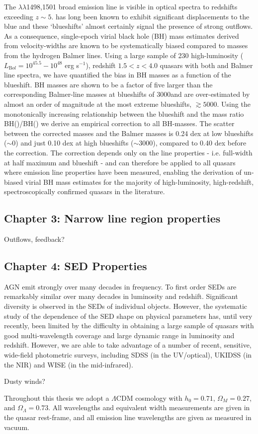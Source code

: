 The $\lambda\lambda$1498,1501 broad emission line is visible in optical spectra to redshifts exceeding $z\sim5$. 
 has long been known to exhibit significant displacements to the blue and these `blueshifts' almost certainly signal the presence of strong outflows.
As a consequence, single-epoch virial black hole (BH) mass estimates derived from  velocity-widths are known to be systematically biased compared to masses from the hydrogen Balmer lines. 
Using a large sample of 230 high-luminosity ($L_{\mathrm Bol} = 10^{45.5}-10^{48}$ erg s$^{-1}$), redshift $1.5 < z < 4.0$ quasars with both  and Balmer line spectra, we have quantified the bias in  BH masses as a function of the  blueshift. 
 BH masses are shown to be a factor of five larger than the corresponding Balmer-line masses at  blueshifts of 3000\kms and are over-estimated by almost an order of magnitude at the most extreme blueshifts, $\gtrsim 5000$\kms.
Using the monotonically increasing relationship between the  blueshift and the mass ratio BH()/BH(\hans) we derive an empirical correction to all  BH-masses.
The scatter between the corrected  masses and the Balmer masses is 0.24 dex at low  blueshifts ($\sim$0\kms) and just 0.10 dex at high blueshifts ($\sim$3000\kms), compared to 0.40 dex before the correction. 
The correction depends only on the  line properties - i.e. full-width at half maximum and blueshift - and can therefore be applied to all quasars where  emission line properties have been measured, enabling the derivation of un-biased virial BH mass estimates for the majority of high-luminosity, high-redshift, spectroscopically confirmed quasars in the literature.

\subsection{Chapter 3: Narrow line region properties}

Outflows, feedback? 

\subsection{Chapter 4: SED Properties}

AGN emit strongly over many decades in frequency. 
To first order SEDs are remarkably similar over many decades in luminosity and redshift. 
Significant diversity is observed in the SEDs of individual objects. 
However, the systematic study of the dependence of the SED shape on physical parameters has, until very recently, been limited by the difficulty in obtaining a large sample of quasars with good multi-wavelength coverage and large dynamic range in luminosity and redshift. 
However, we are able to take advantage of a number of recent, sensitive, wide-field photometric surveys, including SDSS (in the UV/optical), UKIDSS (in the NIR) and WISE (in the mid-infrared).

Dusty winds?

Throughout this thesis we adopt a $\Lambda$CDM cosmology with $h_0=0.71$, $\Omega_M=0.27$, and $\Omega_\Lambda=0.73$. 
All wavelengths and equivalent width measurements are given in the quasar rest-frame, and all emission line wavelengths are given as measured in vacuum.
